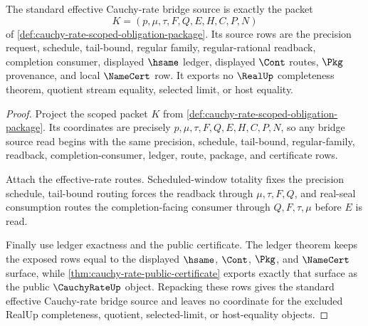 \begin{theorem}
\label{thm:cauchy-rate-bridge-source-exactness}
The standard effective Cauchy-rate bridge source is exactly the packet
$$
K=(p,\mu,\tau,F,Q,E,H,C,P,N)
$$
of \autoref{def:cauchy-rate-scoped-obligation-package}. Its source rows are the precision request, schedule, tail-bound, regular family, regular-rational readback, completion consumer, displayed $\hsame$ ledger, displayed $\Cont$ routes, $\Pkg$ provenance, and local $\NameCert$ row. It exports no $\RealUp$ completeness theorem, quotient stream equality, selected limit, or host equality.
\end{theorem}
\begin{proof}
Project the scoped packet $K$ from \autoref{def:cauchy-rate-scoped-obligation-package}. Its coordinates are precisely $p,\mu,\tau,F,Q,E,H,C,P,N$, so any bridge source read begins with the same precision, schedule, tail-bound, regular-family, readback, completion-consumer, ledger, route, package, and certificate rows.

Attach the effective-rate routes. Scheduled-window totality fixes the precision schedule, tail-bound routing forces the readback through $\mu,\tau,F,Q$, and real-seal consumption routes the completion-facing consumer through $Q,F,\tau,\mu$ before $E$ is read.

Finally use ledger exactness and the public certificate. The ledger theorem keeps the exposed rows equal to the displayed $\hsame$, $\Cont$, $\Pkg$, and $\NameCert$ surface, while \autoref{thm:cauchy-rate-public-certificate} exports exactly that surface as the public $\CauchyRateUp$ object. Repacking these rows gives the standard effective Cauchy-rate bridge source and leaves no coordinate for the excluded RealUp completeness, quotient, selected-limit, or host-equality objects.
\end{proof}

